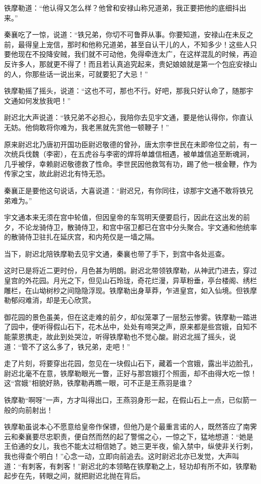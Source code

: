 \documentclass[12pt,oneside]{book}
\begin{document}
铁摩勒道：``他认得又怎么样？他曾和安禄山称兄道弟，我正要把他的底细抖出来。''

秦襄吃了一惊，说道：``铁兄弟，你切不可鲁莽从事。你要知道，安禄山在未反之前，最得皇上宠信，那时和他称兄道弟，甚至自认干儿的人，不知多少！这些人只要他现在不投降安贼，我们就不可动他，免得牵连太广，在这样混乱的时候，再迫反许多人，那就更不得了！而且若认真追究起来，贵妃娘娘就是第一个包庇安禄山的人，你那些话一说出来，可就要犯了大忌！''

铁摩勒摇了摇头，说道：``这也不可，那也不行。好吧，那我只好认命了，随那宇文通如何发放我吧！''

尉迟北大声说道：``铁兄弟不必担心，我陪你去见宇文通，要是他认得你，你直认无妨。他倘敢将你难为，我老黑就先赏他一顿鞭子！''

原来尉迟北乃唐初开国功臣尉迟敬德的曾孙，唐太宗李世民在未即帝位之前，有一次统兵伐魏（李密），在五虎谷与李密的焊将单雄信相遇，被单雄信追至断魂涧，几乎被俘，幸赖尉迟敬德救了性命。李世民因他救驾有功，踢了他一根金鞭，作为传家之宝，故此尉迟北有恃无恐。

秦襄正是要他这句说话，大喜说道：``尉迟兄，有你同往，谅那宇文通不敢将铁兄弟难为。''

宇文通本来无须在宫中轮值，但因皇帝的车驾明天便要启行，因此在这出发的前夕，不论龙骑侍卫，散骑侍卫，和宫中宿卫都已在宫中分头聚合。宇文通和他统率的散骑侍卫驻扎在延庆宫，和内苑仅是一墙之隔。

当下，尉迟北陪铁摩勒去见宇文通，秦襄也带了手下，到宫中各处巡查。

这时已是将近二更时份，月色甚为明朗。尉迟北带领铁摩勒，从神武门进去，穿过皇宫的外花园。月光之下，但见山石玲珑，奇花烂漫，异草粉垂，亭台楼阁、绣栏雕栏，在山坳树杪之间隐隐浮现。铁摩勒出身草莽，乍进皇宫，如入仙境。但铁摩勒郁闷难消，却是无心欣赏。

御花园的景色虽美，但在这走难的前夕，却似笼罩了一层愁云惨雾。铁摩勒一踏进了园中，便听得假山石下，花木丛中，处处有啼哭之声，原来都是些宫娥，自知不能蒙恩携走，故此到处哭泣，听得铁摩勒也不觉心酸。尉迟北摇了摇头，说道：``管不了这么多了，铁兄弟，走吧！''

走了片刻，将要穿出花园，忽见在一块假山石下，藏着一个宫娥，露出半边脸孔，尉迟北毫不在意，铁摩勒眼光一瞥，正好与那宫娥打个照面，却不由得大吃一惊！这``宫娥''相貌好熟，铁摩勒再瞧一眼，可不正是王燕羽是谁？

铁摩勒``啊呀''一声，方才叫得出口，王燕羽身形一起，在假山石上一点，已似箭一般的向前射出！

铁摩勒虽说本心不愿意给皇帝作保镖，但他乃是个最重言诺的人，既然答应了南霁云和秦襄要尽忠职责，便自然而然的起了警惕之心，一惊之下，猛地想道：``她是王伯通的女儿，我也不能太过相信她了。她三更半夜，偷入禁中，纵使非关行刺，我也得查个明白！''心念一动，立即向前追去。这时尉迟北亦已发觉，大声叫道：``有刺客，有刺客！''尉迟北的本领略在铁摩勒之上，轻功却有所不如，铁摩勒起步在先，转眼之间，就把尉迟北抛在背后。
\end{document}
